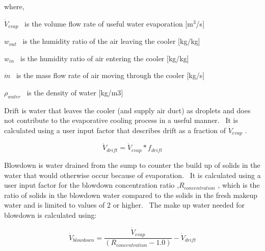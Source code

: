 where,

\({\dot V_{evap}}\) ~is the volume flow rate of useful water evaporation {[}m\(^{3}\)/s{]}

\({w_{out}}\) ~is the humidity ratio of the air leaving the cooler {[}kg/kg{]}

\({w_{in}}\) ~is the humidity ratio of air entering the cooler {[}kg/kg{]}

\(\dot m\) ~is the mass flow rate of air moving through the cooler {[}kg/s{]}

\({\rho_{water}}\) ~is the density of water {[}kg/m3{]}

Drift is water that leaves the cooler (and supply air duct) as droplets and does not contribute to the evaporative cooling process in a useful manner.~ It is calculated using a user input factor that describes drift as a fraction of \({\dot V_{evap}}\) .

\begin{equation}
{\dot V_{drift}} = {\dot V_{evap}} * {f_{drift}}
\end{equation}

Blowdown is water drained from the sump to counter the build up of solids in the water that would otherwise occur because of evaporation.~ It is calculated using a user input factor for the blowdown concentration ratio ,\({R_{concentration}}\) , which is the ratio of solids in the blowdown water compared to the solids in the fresh makeup water and is limited to values of 2 or higher.~ The make up water needed for blowdown is calculated using:

\begin{equation}
{\dot V_{blowdown}} = \frac{{{{\dot V}_{evap}}}}{{\left( {{R_{concentration}} - 1.0} \right)}} - {\dot V_{drift}}
\end{equation}
